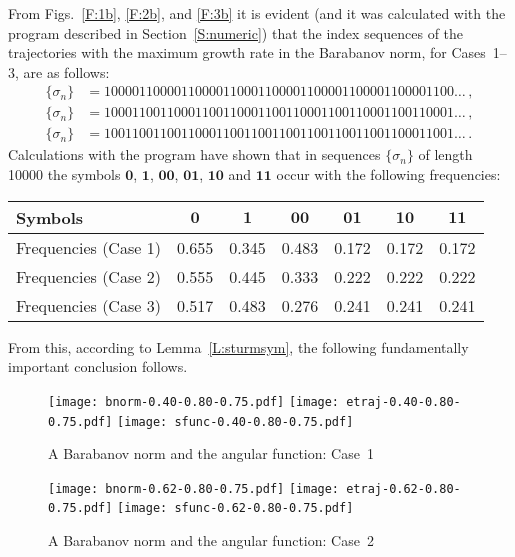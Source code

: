 \documentclass[a4paper,10pt,reqno]{amsart}
\begin{document}
From Figs.~\ref{F:1b}, \ref{F:2b}, and \ref{F:3b} it is evident (and it was
calculated with the program \texttt{} described in
Section~\ref{S:numeric}) that the index sequences of the trajectories with the
maximum growth rate in the Barabanov norm, for Cases~1--3, are as follows:
\begin{align*}
\{\sigma_{n}\}&=10000110000110000110001100001100001100001100001100\ldots\,,\\
\{\sigma_{n}\}&=10001100110001100110001100110001100110001100110001\ldots\,,\\
\{\sigma_{n}\}&=10011001100110001100110011001100110011001100011001\ldots\,.
\end{align*}
Calculations with the program \texttt{} have shown
that in sequences $\{\sigma_{n}\}$ of length 10000 the symbols
$\boldsymbol{0}$, $\boldsymbol{1}$, $\boldsymbol{00}$, $\boldsymbol{01}$,
$\boldsymbol{10}$ and $\boldsymbol{11}$ occur with the following frequencies:
\begin{center}
\begin{tabular}{lcccccc}
Symbols   & $\boldsymbol{0}$& $\boldsymbol{1}$& $\boldsymbol{00}$&
$\boldsymbol{01}$& $\boldsymbol{10}$& $\boldsymbol{11}$\\ \hline
Frequencies (Case 1)&0.655&0.345&0.483&0.172&0.172&0.172\\
Frequencies (Case 2)&0.555&0.445&0.333&0.222&0.222&0.222\\
Frequencies (Case 3)&0.517&0.483&0.276&0.241&0.241&0.241
\end{tabular}
\end{center}
From this, according to Lemma~\ref{L:sturmsym}, the following fundamentally
important conclusion follows.

\begin{figure}[htbp!]
\centering \mbox{}\hfill{}
{\texttt{[image: bnorm-0.40-0.80-0.75.pdf]}}
\hfill{}
{\texttt{[image: etraj-0.40-0.80-0.75.pdf]}}
\hfill{}
{\texttt{[image: sfunc-0.40-0.80-0.75.pdf]}}
\hfill\mbox{} \caption{A Barabanov norm and the angular function:
Case~1}\label{F:1}
\end{figure}

\begin{figure}[htbp!]
\centering \mbox{}\hfill{}
{\texttt{[image: bnorm-0.62-0.80-0.75.pdf]}}
\hfill{}
{\texttt{[image: etraj-0.62-0.80-0.75.pdf]}}
\hfill{}
{\texttt{[image: sfunc-0.62-0.80-0.75.pdf]}}
\hfill\mbox{} \caption{A Barabanov norm and the angular function:
Case~2}\label{F:2}
\end{figure}
\end{document}
